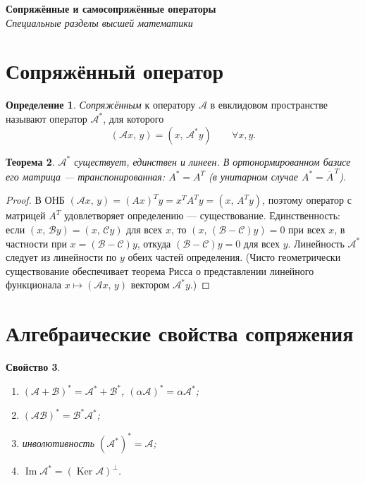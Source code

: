\documentclass[11pt,a4paper]{article}
\newcommand{\coursename}{Специальные разделы высшей математики}
\newcommand{\doctitle}{Сопряжённые и самосопряжённые операторы}
\theoremstyle{definition}
\newtheorem{definition}{Определение}[section]
\theoremstyle{plain}
\newtheorem{theorem}[definition]{Теорема}
\newtheorem{property}[definition]{Свойство}
\DeclareMathOperator{\Ker}{Ker}
\DeclareMathOperator{\Img}{Im}
\newcommand{\scal}[2]{\left( #1,\,#2\right)}
\begin{document}
\begin{center}
  {\LARGE\bfseries \doctitle}\\[4pt]
  {\large\itshape \coursename}
\end{center}
\vspace{6pt}

\section{Сопряжённый оператор}

\begin{definition}
\emph{Сопряжённым} к оператору $\mathcal A$ в евклидовом пространстве называют оператор
$\mathcal A^*$, для которого
\[
  \scal{\mathcal Ax}{y}=\scal{x}{\mathcal A^*y}\qquad\forall x,y .
\]
\end{definition}

\begin{theorem}
$\mathcal A^*$ существует, единствен и линеен. В ортонормированном базисе его матрица —
транспонированная: $A^*=A^{T}$ (в унитарном случае $A^*=\overline{A}^{\,T}$).
\end{theorem}

\begin{proof}
В ОНБ $\scal{\mathcal Ax}{y}=(Ax)^{T}y=x^{T}A^{T}y=\scal{x}{A^{T}y}$, поэтому оператор с матрицей
$A^{T}$ удовлетворяет определению — существование. Единственность: если
$\scal x{\mathcal By}=\scal x{\mathcal Cy}$ для всех $x$, то $\scal x{(\mathcal B-\mathcal C)y}=0$
при всех $x$, в частности при $x=(\mathcal B-\mathcal C)y$, откуда $(\mathcal B-\mathcal C)y=0$ для
всех $y$. Линейность $\mathcal A^*$ следует из линейности по $y$ обеих частей определения. (Чисто
геометрически существование обеспечивает теорема Рисса о представлении линейного функционала
$x\mapsto\scal{\mathcal Ax}{y}$ вектором $\mathcal A^*y$.)
\end{proof}

\section{Алгебраические свойства сопряжения}

\begin{property}\leavevmode
\begin{enumerate}[label=\arabic*),leftmargin=*,nosep]
  \item $(\mathcal A+\mathcal B)^*=\mathcal A^*+\mathcal B^*$, $(\alpha\mathcal A)^*=\alpha\mathcal A^*$;
  \item $(\mathcal A\mathcal B)^*=\mathcal B^*\mathcal A^*$;
  \item инволютивность $(\mathcal A^*)^*=\mathcal A$;
  \item $\Img\mathcal A^*=(\Ker\mathcal A)^\perp$.
\end{enumerate}
\end{property}
\end{document}
